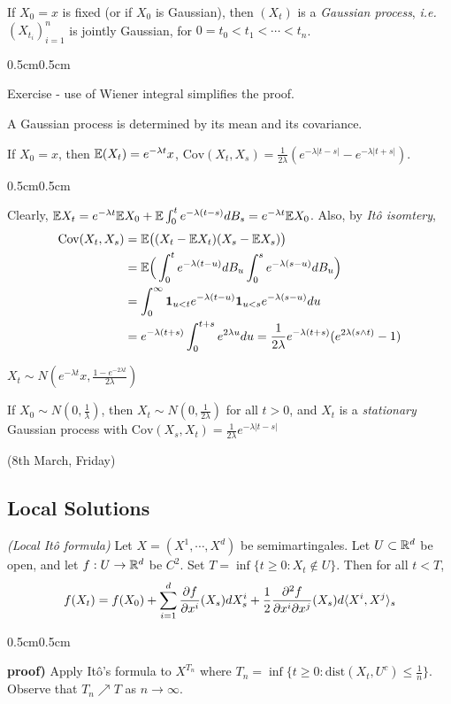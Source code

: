 \documentclass[10pt,a4paper]{article}
\newenvironment{proof}
{\begin{changemargin}{0.5cm}{0.5cm} 
	}%
	{\end{changemargin}
}
\newenvironment{p}
{\begin{proof} 
	}%
	{\end{proof}
}
\begin{document}
\fact If $X_0 =x$ is fixed (or if $X_0$ is Gaussian), then $(X_t)$ is a \emph{Gaussian process}, \textit{i.e.} $(X_{t_i})_{i=1}^n$ is jointly Gaussian, for $0=t_0 < t_1 <\cdots <t_n$.
\begin{p}
\pf Exercise - use of Wiener integral simplifies the proof.
\end{p}
\s

A Gaussian process is determined by its mean and its covariance.
\s

\fact If $X_0 =x$, then $\mathbb{E}(X_t) = e^{-\lambda t} x$, $\text{Cov}(X_t, X_s) = \frac{1}{2\lambda} (e^{-\lambda |t-s|}- e^{-\lambda |t+s|})$.
\begin{p}
\pf Clearly, $\mathbb{E} X_t = e^{-\lambda t} \mathbb{E} X_0 + \mathbb{E} \int_0^t e^{-\lambda (t-s)}dB_s = e^{-\lambda t} \mathbb{E} X_0$. Also, by \emph{It\^o isomtery},
\begin{align*}
\text{Cov}(X_t, X_s) &= \mathbb{E} \big( (X_t -\mathbb{E} X_t)(X_s -\mathbb{E} X_s) \big) \\
&= \mathbb{E} \Big( \int_0^t e^{-\lambda (t-u)} dB_u \int_0^s e^{-\lambda (s-u)} dB_u \Big) \\
&= \int_0^{\infty} \bm{1}_{u<t} e^{-\lambda (t-u)} \bm{1}_{u<s} e^{-\lambda (s-u)} du \\
&= e^{-\lambda(t+s)} \int_0^{t+s} e^{2\lambda u} du  = \frac{1}{2\lambda} e^{-\lambda(t+s)} (e^{2\lambda(s\wedge t)}-1)
\end{align*} 
\eop
\end{p}
\s

\corr $X_t \sim N (e^{-\lambda t}x, \frac{1-e^{-2\lambda t}}{2\lambda})$
\s

\fact If $X_0 \sim N(0, \frac{1}{\lambda})$, then $X_t \sim N(0, \frac{1}{2\lambda})$ for all $t>0$, and $X_t$ is a \emph{stationary} Gaussian process with $\text{Cov}(X_s, X_t) = \frac{1}{2\lambda}e^{-\lambda |t-s|}$
\s

\newday

(8th March, Friday)

\subsection{Local Solutions}

\prop \emph{(Local It\^o formula)} Let $X = (X^1, \cdots, X^d)$ be semimartingales. Let $U\subset \mathbb{R}^d$ be open, and let $f: U\rightarrow \mathbb{R}^d$ be $C^2$. Set $T =\inf\{ t\geq 0: X_t \not\in U\}$. Then for all $t<T$,
\begin{align*}
f(X_t) = f(X_0) + \sum_{i=1}^d \frac{\partial f}{\partial x^i} (X_s) dX_s^i + \frac{1}{2}\frac{\partial^2 f}{\partial x^i \partial x^j}(X_s) d\langle X^i, X^j \rangle_s
\end{align*}
\begin{p}
\textbf{proof)} Apply It\^o's formula to $X^{T_n}$ where $T_n = \inf\{ t\geq 0 : \text{dist}(X_t, U^c) \leq \frac{1}{n}\}$. Observe that $T_n \nearrow T$ as $n\rightarrow \infty$. 

\eop
\end{p}
\s
\end{document}

